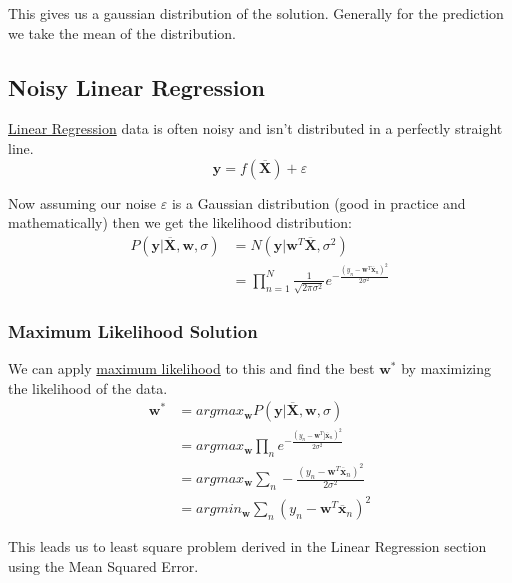 \documentclass[12pt]{article}
\begin{document}
            This gives us a gaussian distribution of the solution. Generally for the prediction we take the mean of the
            distribution. 
    
    \subsection{Noisy Linear Regression} \label{sec:StatisticalLinearRegression}
        \hyperref[sec:LinearRegression]{Linear Regression} data is often noisy and isn't distributed in a perfectly
        straight line. 
        $$ \boldsymbol{y} = f(\overline{\boldsymbol{X}}) + \varepsilon $$

        Now assuming our noise $\varepsilon$ is a Gaussian distribution (good in practice and mathematically) then we
        get the likelihood distribution:
        \begin{align*}
            P(\boldsymbol{y}|\overline{\boldsymbol{X}},\boldsymbol{w}, \sigma) &= N(\boldsymbol{y}|\boldsymbol{w}^T\overline{\boldsymbol{X}}, \sigma^2) \\
            &= \prod_{n=1}^N \frac{1}{\sqrt{2\pi\sigma^2}}e^{-\frac{(y_n - \boldsymbol{w}^T \overline{\boldsymbol{x}}_n)^2}{2\sigma^2}}
        \end{align*}
        
        \subsubsection{Maximum Likelihood Solution}
            We can apply \hyperref[sec:ML]{maximum likelihood} to this and find the best $\boldsymbol{w}^*$ by
            maximizing the likelihood of the data.
            \begin{align*}
                \boldsymbol{w^*} &= argmax_{\boldsymbol{w}} P(\boldsymbol{y}|\overline{\boldsymbol{X}}, \boldsymbol{w}, \sigma) \\
                &= argmax_{\boldsymbol{w}} \prod_{n} e^{-\frac{(y_n - \boldsymbol{w}^T] \overline{\boldsymbol{x}}_n)^2}{2\sigma^2}} \\
                &= argmax_{\boldsymbol{w}} \sum_{n} -\frac{(y_n - \boldsymbol{w}^T \overline{\boldsymbol{x}}_n)^2}{2\sigma^2} \\
                &= argmin_{\boldsymbol{w}} \sum_{n} (y_n - \boldsymbol{w}^T \overline{\boldsymbol{x}}_n)^2
            \end{align*}

            This leads us to least square problem derived in the Linear Regression section using the Mean Squared Error.
\end{document}
